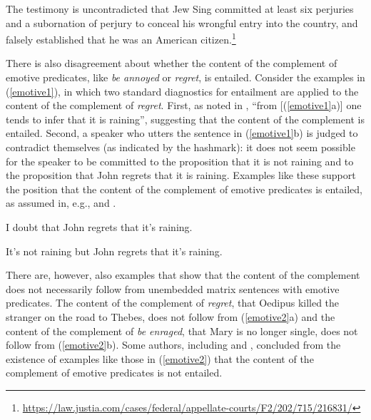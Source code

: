 \documentclass[11pt,fleqn]{article}
\def\infelic{{\leavevmode\llap{\#}}}
\newcommand{\6}{\mbox{$[\hspace*{-.6mm}[$}}
\newcommand{\9}{\mbox{$]\hspace*{-.6mm}]$}}
\begin{document}
\begin{exe}
\ex\label{establish} The testimony is uncontradicted that Jew Sing committed at least six perjuries and a subornation of perjury to conceal his wrongful entry into the country, and falsely established that he was an American citizen.\footnote{\url{https://law.justia.com/cases/federal/appellate-courts/F2/202/715/216831/}}
\end{exe}

There is also disagreement about whether the content of the complement of emotive predicates, like {\em be annoyed} or {\em regret}, is entailed. Consider the examples in (\ref{emotive1}), in which two standard diagnostics for entailment are applied to the content of the complement of {\em regret}. First, as noted in \citealt[514]{abrusan2011}, ``from [(\ref{emotive1}a)] one tends to infer that it is raining'', suggesting that the content of the complement is entailed. Second, a speaker who utters the sentence in (\ref{emotive1}b) is judged to contradict themselves (as indicated by the hashmark): it does not seem possible for the speaker to be committed to the proposition that it is not raining and to the proposition that John regrets that it is raining. Examples like these support the position that the content of the  complement of emotive predicates is entailed, as assumed in, e.g., \citealt{gazdar79a,abrusan2011} and \citealt{anand-hacquard2014}.

\begin{exe}

\ex\label{emotive1} \citealt[514]{abrusan2011}

\begin{xlist}

\ex I doubt that John regrets that it's raining.

\ex \infelic It's not raining but John regrets that it's raining. 

\end{xlist}

\end{exe}

There are, however, also examples that show that the content of the complement does not necessarily follow from unembedded matrix sentences with emotive predicates. The content of the complement of {\em regret}, that Oedipus killed the stranger on the road to Thebes, does not follow from (\ref{emotive2}a) and the content of the complement of {\em be enraged}, that Mary is no longer single, does not follow from (\ref{emotive2}b). Some authors, including \citet{klein1975,giannakidou1998,schlenker2003} and \citet{egre2008}, concluded from the existence of examples like those in (\ref{emotive2}) that the content of the complement of emotive predicates is not entailed.
\end{document}
